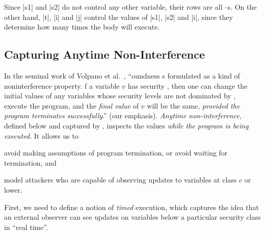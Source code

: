 Since \prc|s1| and \prc|s2| do not control any other variable, their rows are
all $\cdot$s. On the other hand, \prc|t|, \prc|i| and \prc|j| control the values
of \prc|s1|, \prc|s2| and \prc|i|, since they determine how many times the body
will execute.

\subsection{Capturing Anytime Non-Interference}%
\label{subsec:ni-soundness}

In the seminal work of Volpano et al.~\cite[pg.~173]{volpanoI1996},
\enquote{oundness s formulated as a kind of
noninterference property. f a variable $v$ has security
 , then one can change the initial values of any variables
whose security levels are not dominated by  , execute the program,
and the \emph{final value} of $v$ will be the same, \emph{provided the program
terminates successfully}.} (our emphasis). \emph{Anytime non-interference},
defined below and captured by \lname, inspects the values \emph{while the
program is being executed}. It allows us to
\begin{enumerate*}
\item avoid making assumptions of program termination, or avoid waiting for
termination, and
\item model attackers who are capable of observing updates to variables at class
$c$ or lower.
\end{enumerate*}

First, we need to define a notion of \emph{timed} execution, which captures the
idea that an external observer can see updates on variables below a particular
security class in \enquote{real time}.

